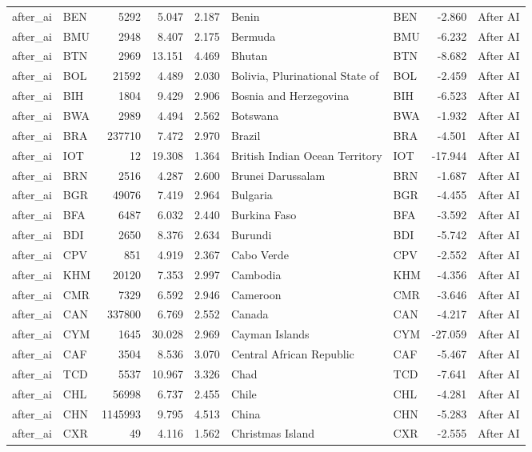 \begin{tabular}{llrrrllrl}
after\_ai & BEN & 5292 & 5.047 & 2.187 & Benin & BEN & -2.860 & After AI \\
after\_ai & BMU & 2948 & 8.407 & 2.175 & Bermuda & BMU & -6.232 & After AI \\
after\_ai & BTN & 2969 & 13.151 & 4.469 & Bhutan & BTN & -8.682 & After AI \\
after\_ai & BOL & 21592 & 4.489 & 2.030 & Bolivia, Plurinational State of & BOL & -2.459 & After AI \\
after\_ai & BIH & 1804 & 9.429 & 2.906 & Bosnia and Herzegovina & BIH & -6.523 & After AI \\
after\_ai & BWA & 2989 & 4.494 & 2.562 & Botswana & BWA & -1.932 & After AI \\
after\_ai & BRA & 237710 & 7.472 & 2.970 & Brazil & BRA & -4.501 & After AI \\
after\_ai & IOT & 12 & 19.308 & 1.364 & British Indian Ocean Territory & IOT & -17.944 & After AI \\
after\_ai & BRN & 2516 & 4.287 & 2.600 & Brunei Darussalam & BRN & -1.687 & After AI \\
after\_ai & BGR & 49076 & 7.419 & 2.964 & Bulgaria & BGR & -4.455 & After AI \\
after\_ai & BFA & 6487 & 6.032 & 2.440 & Burkina Faso & BFA & -3.592 & After AI \\
after\_ai & BDI & 2650 & 8.376 & 2.634 & Burundi & BDI & -5.742 & After AI \\
after\_ai & CPV & 851 & 4.919 & 2.367 & Cabo Verde & CPV & -2.552 & After AI \\
after\_ai & KHM & 20120 & 7.353 & 2.997 & Cambodia & KHM & -4.356 & After AI \\
after\_ai & CMR & 7329 & 6.592 & 2.946 & Cameroon & CMR & -3.646 & After AI \\
after\_ai & CAN & 337800 & 6.769 & 2.552 & Canada & CAN & -4.217 & After AI \\
after\_ai & CYM & 1645 & 30.028 & 2.969 & Cayman Islands & CYM & -27.059 & After AI \\
after\_ai & CAF & 3504 & 8.536 & 3.070 & Central African Republic & CAF & -5.467 & After AI \\
after\_ai & TCD & 5537 & 10.967 & 3.326 & Chad & TCD & -7.641 & After AI \\
after\_ai & CHL & 56998 & 6.737 & 2.455 & Chile & CHL & -4.281 & After AI \\
after\_ai & CHN & 1145993 & 9.795 & 4.513 & China & CHN & -5.283 & After AI \\
after\_ai & CXR & 49 & 4.116 & 1.562 & Christmas Island & CXR & -2.555 & After AI \\

\end{tabular}
